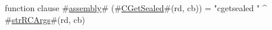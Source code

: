 function clause #\hyperref[sailMIPSzassembly]{assembly}# (#\hyperref[sailMIPSzCGetSealed]{CGetSealed}#(rd, cb)) = "cgetsealed " ^ #\hyperref[sailMIPSzstrRCArgs]{strRCArgs}#(rd, cb)
